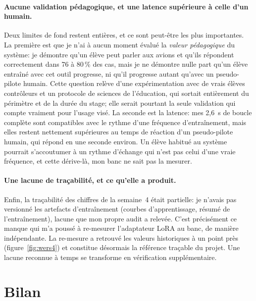 \documentclass[11pt,a4paper]{article}
\begin{document}
\paragraph{Aucune validation pédagogique, et une latence supérieure à celle d'un humain.} Deux limites de fond restent entières, et ce sont peut-être les plus importantes. La première est que je n'ai à aucun moment évalué la \emph{valeur pédagogique} du système: je démontre qu'un élève peut parler aux avions et qu'ils répondent correctement dans 76 à 80\,\% des cas, mais je ne démontre nulle part qu'un élève entraîné avec cet outil progresse, ni qu'il progresse autant qu'avec un pseudo-pilote humain. Cette question relève d'une expérimentation avec de vrais élèves contrôleurs et un protocole de sciences de l'éducation, qui sortait entièrement du périmètre et de la durée du stage; elle serait pourtant la seule validation qui compte vraiment pour l'usage visé. La seconde est la latence: mes 2,6~s de boucle complète sont compatibles avec le rythme d'une fréquence d'entraînement, mais elles restent nettement supérieures au temps de réaction d'un pseudo-pilote humain, qui répond en une seconde environ. Un élève habitué au système pourrait s'accoutumer à un rythme d'échange qui n'est pas celui d'une vraie fréquence, et cette dérive-là, mon banc ne sait pas la mesurer. 

\paragraph{Une lacune de traçabilité, et ce qu'elle a produit.} Enfin, la traçabilité des chiffres de la semaine~4 était partielle: je n'avais pas versionné les artefacts d'entraînement (courbes d'apprentissage, résumé de l'entraînement), lacune que mon propre audit a relevée. C'est précisément ce manque qui m'a poussé à re-mesurer l'adaptateur LoRA au banc, de manière indépendante. La re-mesure a retrouvé les valeurs historiques à un point près (figure~\ref{fig:wers4}) et constitue désormais la référence traçable du projet. Une lacune reconnue à temps se transforme en vérification supplémentaire. 


\section{Bilan}
\end{document}
